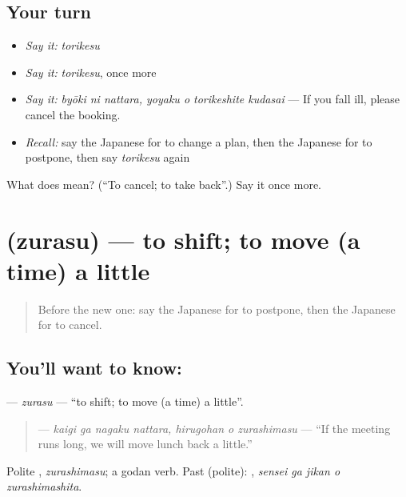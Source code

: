 \subsection*{Your turn}
\begin{itemize}
\raggedright
  \item \emph{Say it:} \emph{torikesu}
  \item \emph{Say it:} \emph{torikesu}, once more
  \item \emph{Say it:} \emph{byōki ni nattara, yoyaku o torikeshite kudasai} — If you fall ill, please cancel the booking.
  \item \emph{Recall:} say the Japanese for to change a plan, then the Japanese for to postpone, then say \emph{torikesu} again
\end{itemize}

\begin{tcolorbox}[breakable,colback=teal!4,colframe=teal!35!black,title={Before you move on}]
What does  mean? (\textquotedblleft{}To cancel; to take back\textquotedblright{}.) Say it once more.
\end{tcolorbox}
\section[\texorpdfstring{\ja{ずらす} (zurasu)}{ずらす (zurasu)}]{ (zurasu) — to shift; to move (a time) a little}

\label{lesson:JA-C345-zurasu}



\begin{quote}
Before the new one: say the Japanese for to postpone, then the Japanese for to cancel.
\end{quote}

\subsection*{You'll want to know: }
\textbf{} — \emph{zurasu} — \textquotedblleft{}to shift; to move (a time) a little\textquotedblright{}.

\begin{quote}
\textbf{   } — \emph{kaigi ga nagaku nattara, hirugohan o zurashimasu} — \textquotedblleft{}If the meeting runs long, we will move lunch back a little.\textquotedblright{}
\end{quote}

Polite \textbf{}, \emph{zurashimasu}; a godan verb. Past (polite): \textbf{  }, \emph{sensei ga jikan o zurashimashita}.

